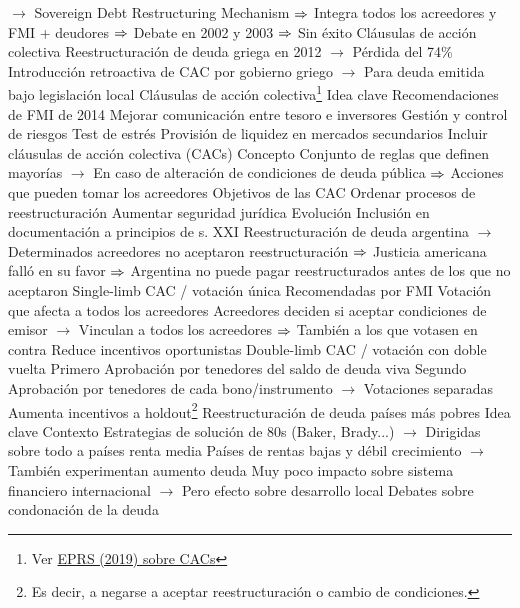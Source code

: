 \documentclass{nuevotema}
\begin{document}
\begin{esquemal}
				\4[] $\to$ Sovereign Debt Restructuring Mechanism
				\4[] $\Rightarrow$ Integra todos los acreedores y FMI + deudores
				\4[] $\Rightarrow$ Debate en 2002 y 2003
				\4[] $\Rightarrow$ Sin éxito
				\4 Cláusulas de acción colectiva
				\4[] Reestructuración de deuda griega en 2012
				\4[] $\to$ Pérdida del 74\%
				\4[] Introducción retroactiva de CAC por gobierno griego
				\4[] $\to$ Para deuda emitida bajo legislación local
		\2 Cláusulas de acción colectiva\footnote{Ver \href{https://www.europarl.europa.eu/RegData/etudes/BRIE/2019/637974/EPRS_BRI(2019)637974_EN.pdf}{EPRS (2019) sobre CACs}}
			\3 Idea clave
				\4 Recomendaciones de FMI de 2014
				\4[] Mejorar comunicación entre tesoro e inversores
				\4[] Gestión y control de riesgos
				\4[] Test de estrés
				\4[] Provisión de liquidez en mercados secundarios
				\4[] Incluir cláusulas de acción colectiva (CACs)
				\4 Concepto
				\4[] Conjunto de reglas que definen mayorías
				\4[] $\to$ En caso de alteración de condiciones de deuda pública
				\4[] $\Rightarrow$ Acciones que pueden tomar los acreedores
				\4 Objetivos de las CAC
				\4[] Ordenar procesos de reestructuración
				\4[] Aumentar seguridad jurídica
				\4 Evolución
				\4[] Inclusión en documentación a principios de s. XXI
				\4[] Reestructuración de deuda argentina
				\4[] $\to$ Determinados acreedores no aceptaron reestructuración
				\4[] $\Rightarrow$ Justicia americana falló en su favor
				\4[] $\Rightarrow$ Argentina no puede pagar reestructurados antes de los que no aceptaron
			\3 Single-limb CAC / votación única
				\4 Recomendadas por FMI
				\4 Votación que afecta a todos los acreedores
				\4[] Acreedores deciden si aceptar condiciones de emisor
				\4[] $\to$ Vinculan a todos los acreedores
				\4[] $\Rightarrow$ También a los que votasen en contra
				\4 Reduce incentivos oportunistas
			\3 Double-limb CAC / votación con doble vuelta
				\4 Primero
				\4[] Aprobación por tenedores del saldo de deuda viva
				\4 Segundo
				\4[] Aprobación por tenedores de cada bono/instrumento
				\4[] $\to$ Votaciones separadas
				\4 Aumenta incentivos a holdout\footnote{Es decir, a negarse a aceptar reestructuración o cambio de condiciones.}
		\2 Reestructuración de deuda países más pobres
			\3 Idea clave
				\4 Contexto
				\4[] Estrategias de solución de 80s (Baker, Brady...)
				\4[] $\to$ Dirigidas sobre todo a países renta media
				\4[] Países de rentas bajas y débil crecimiento
				\4[] $\to$ También experimentan aumento deuda
				\4[] Muy poco impacto sobre sistema financiero internacional
				\4[] $\to$ Pero efecto sobre desarrollo local
				\4[] Debates sobre condonación de la deuda

\end{esquemal}
\end{document}
